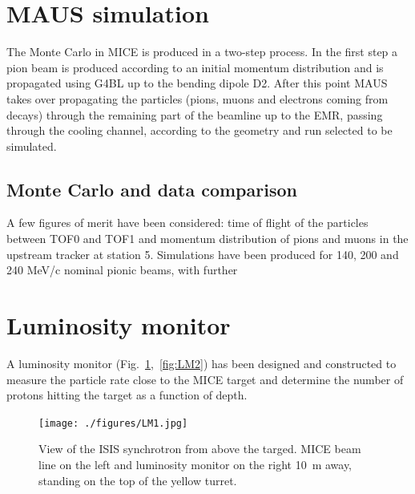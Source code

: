 \documentclass[a4paper,11pt]{article}
\begin{document}
\section{MAUS simulation}

The Monte Carlo in MICE is produced in a two-step process. In the first step a pion beam is produced according to an initial momentum distribution and is propagated using G4BL up to the bending dipole D2. After this point MAUS takes over propagating the particles (pions, muons and electrons coming from decays) through the remaining part of the beamline up to the EMR, passing through the cooling channel, according to the geometry and run selected to be simulated. 

\subsection{Monte Carlo and data comparison}

A few figures of merit have been considered: time of flight of the particles between TOF0 and TOF1 and momentum distribution of pions and muons in the upstream tracker at station 5.
Simulations have been produced for 140, 200 and 240 MeV/c nominal pionic beams, with further 

\section{Luminosity monitor}
A luminosity monitor (Fig.~\ref{fig:LM1},~\ref{fig:LM2}) has been designed and constructed to measure the particle rate close to the MICE target and determine the number of protons hitting the target as a function of depth.
\begin{figure}
  \begin{center}
    \texttt{[image: ./figures/LM1.jpg]}
    \caption{View of the ISIS synchrotron from above the targed. MICE beam line on the left and luminosity monitor on the right 10~m away, standing on the top of the yellow turret.}
    \label{fig:LM1}
  \end{center}
\end{figure}
\end{document}
